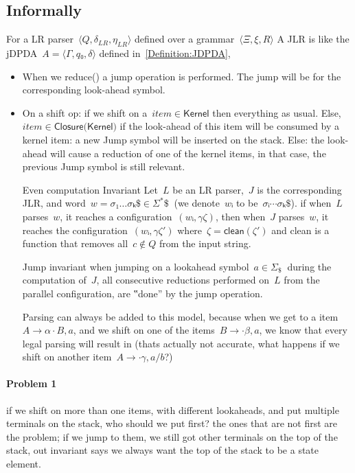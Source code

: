 \subsection{Informally}

For a LR parser~$⟨Q,δ_{LR}, η_{LR}⟩$ defined over a grammar~$⟨Ξ,ξ,R⟩$
A JLR is like the jDPDA~$A=⟨Γ,q₀,δ⟩$ defined in~\cref{Definition:JDPDA},

\begin{itemize}
  \item When we \textsf{reduce()} a jump operation is performed.
    The jump will be for the corresponding look-ahead symbol.
  \item On a shift op:
  if we shift on a~$item∈\textsf{Kernel}$
    then everything as usual.
  Else,~$item∈\textsf{Closure(Kernel)}$
      if the look-ahead of this item will be consumed by a kernel item:
        a new Jump symbol will be inserted on the stack.
      Else:
        the look-ahead will cause a reduction of one of the kernel items,
        in that case, the previous Jump symbol is still relevant.
  \item[Even computation Invariant]
    Let~$L$ be an LR parser,~$J$ is the corresponding JLR, and word~$w =σ₁…σₖ \$∈Σ^*\$~$ (we denote~$wᵢ$ to be~$σᵢ⋯σₖ \$$).
    if when~$L$ parses~$w$, it reaches a configuration~$(wᵢ,γζ)$,
    then when~$J$ parses~$w$, it reaches the configuration~$(wᵢ,γζ')$ where~$ζ= \textsf{clean}(ζ')$
    and \textsf{clean} is a function that removes all~$c \notin Q$ from the input string.
  \item[Jump invariant]
    when jumping on a lookahead symbol~$a∈Σ_\$~$ during the computation of~$J$,
    all consecutive reductions performed on~$L$ from the parallel configuration, are ‟done” by the \textsf{jump} operation.
  \item[Parsing] can always be added to this model, because when we get to a item~$A→α·B,a$, and we shift on
    one of the items~$B→·β,a$, we know that every legal parsing will result in (thats actually not accurate, what happens
    if we shift on another item~$A→·γ,a/b$?)
\end{itemize}
\paragraph{Problem 1} if we shift on more than one items, with different lookaheads,
  and put multiple terminals on the stack, who should we put first? the ones that are
  not first are the problem; if we jump to them, we still got other terminals on the
  top of the stack, out invariant says we always want the top of the stack to be a
  state element.

